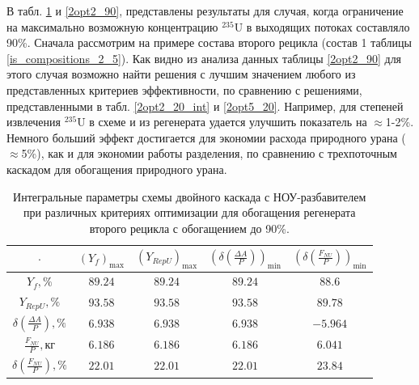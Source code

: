 В табл. \ref{2opt2_90_int} и \ref{2opt2_90}, представлены результаты для случая, когда ограничение на максимально возможную концентрацию $^{235}$U в выходящих потоках составляло 90\%. Сначала рассмотрим на примере состава второго рецикла (состав 1 таблицы \ref{is_compositions_2_5}). Как видно из анализа данных таблицы \ref{2opt2_90} для этого случая возможно найти решения с лучшим значением любого из представленных критериев эффективности, по сравнению с решениями, представленными в табл. \ref{2opt2_20_int} и \ref{2opt5_20}. Например, для степеней извлечения $^{235}$U в схеме и из регенерата удается улучшить показатель на $\approx$1-2\%. Немного больший эффект достигается для экономии расхода природного урана ($\approx$5\%), как и для экономии работы разделения, по сравнению с трехпоточным каскадом для обогащения природного урана.

\begin{table}
    \centering
    \begin{tabular}{|c|cccc|}
        \hline $\cdot$ & $(Y_f)_\text{max}$ & $(Y_{RepU})_\text{max}$ & $(\delta(\frac{\Delta A}{P}))_\text{min}$ & $(\delta(\frac{F_{NU}}{P}))_\text{min}$\\ \hline
        $Y_f, \%$ & $89.24$ & $89.24$ & $89.24$ & $88.6$\\ \hline
        $Y_{RepU}, \%$ & $93.58$ & $93.58$ & $93.58$ & $89.78$\\ \hline
        $\delta(\frac{\Delta A}{P}), \%$ & $6.938$ & $6.938$ & $6.938$ & $-5.964$\\ \hline
        $\frac{F_{NU}}{P}, \text{кг}$ & $6.186$ & $6.186$ & $6.186$ & $6.041$\\ \hline
        $\delta(\frac{F_{NU}}{P}), \%$ & $22.01$ & $22.01$ & $22.01$ & $23.84$\\ \hline
    \end{tabular}
    \caption{Интегральные параметры схемы двойного каскада с НОУ-разбавителем при различных критериях оптимизации для обогащения регенерата второго рецикла с обогащением до 90\%.{\label{2opt2_90_int}}}
\end{table}

